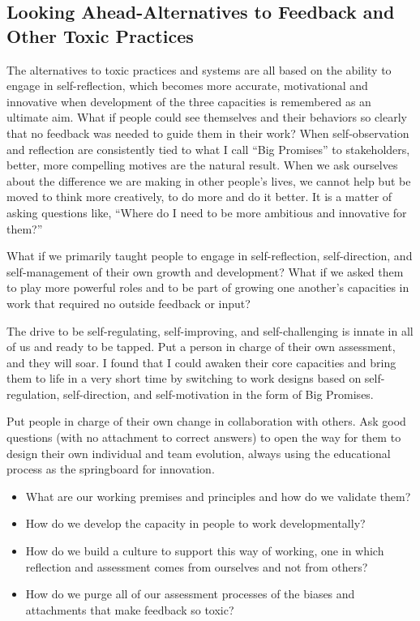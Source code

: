\documentclass[ebook,12pt,oneside,openany]{memoir}
\begin{document}
\subsection{Looking Ahead-Alternatives to Feedback and Other Toxic Practices}
The alternatives to toxic practices and systems are all based on the ability to engage in self-reflection, which becomes more accurate, motivational and innovative when development of the three capacities is remembered as an ultimate aim.
What if people could see themselves and their behaviors so clearly that no feedback was needed to guide them in their work? When self-observation and reflection are consistently tied to what I call ``Big Promises'' to stakeholders, better, more compelling motives are the natural result.
When we ask ourselves about the difference we are making in other people's lives, we cannot help but be moved to think more creatively, to do more and do it better.
It is a matter of asking questions like, ``Where do I need to be more ambitious and innovative for them?''

What if we primarily taught people to engage in self-reflection, self-direction, and self-management of their own growth and development? What if we asked them to play more powerful roles and to be part of growing one another's capacities in work that required no outside feedback or input?

The drive to be self-regulating, self-improving, and self-challenging is innate in all of us and ready to be tapped.
Put a person in charge of their own assessment, and they will soar.
I found that I could awaken their core capacities and bring them to life in a very short time by switching to work designs based on self-regulation, self-direction, and self-motivation in the form of Big Promises.

Put people in charge of their own change in collaboration with others. Ask good questions (with no attachment to correct answers) to open the way for them to design their own individual and team evolution, always using the educational process as the springboard for innovation.

\begin{itemize}
    \item What are our working premises and principles and how do we validate them?
    \item How do we develop the capacity in people to work developmentally?
    \item How do we build a culture to support this way of working, one in which reflection and assessment comes from ourselves and not from others?
    \item How do we purge all of our assessment processes of the biases and attachments that make feedback so toxic?
\end{itemize}
\end{document}
